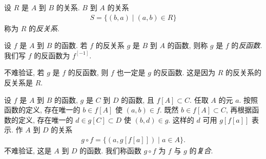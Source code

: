 
\begin{definition}
    设 $R$ 是 $A$ 到 $B$ 的关系. $B$ 到 $A$ 的关系
    \begin{align*}
        S = \{ (b, a) \mid (a, b) \in R \}
    \end{align*}
    称为 $R$ 的\emph{反关系}.
\end{definition}

\begin{definition}
    设 $f$ 是 $A$ 到 $B$ 的函数. 若 $f$ 的反关系 $g$ 是 $B$ 到 $A$ 的函数, 则称 $g$ 是 $f$ 的\emph{反函数}. 我们写 $f$ 的反函数为 $f^{[-1]}$.
\end{definition}

\begin{remark}
    不难验证, 若 $g$ 是 $f$ 的反函数, 则 $f$ 也一定是 $g$ 的反函数. 这是因为 $R$ 的反关系的反关系是 $R$.
\end{remark}

\begin{definition}
    设 $f$ 是 $A$ 到 $B$ 的函数, $g$ 是 $C$ 到 $D$ 的函数, 且 $f[A] \subset C$. 任取 $A$ 的元 $a$. 按照函数的定义, 存在唯一的 $b \in f[A]$ 使 $(a, b) \in f$. 既然 $b \in f[A] \subset C$, 再根据函数的定义, 存在唯一的 $d \in g[C] \subset D$ 使 $(b, d) \in g$. 这样的 $d$ 可用 $g[f[a]]$ 表示. 作 $A$ 到 $D$ 的关系
    \begin{align*}
        g \circ f = \{ (a, g[f[a]]) \mid a \in A \}.
    \end{align*}
    不难验证, 这是 $A$ 到 $D$ 的函数. 我们称函数 $g \circ f$ 为 $f$ 与 $g$ 的\emph{复合}.
\end{definition}

